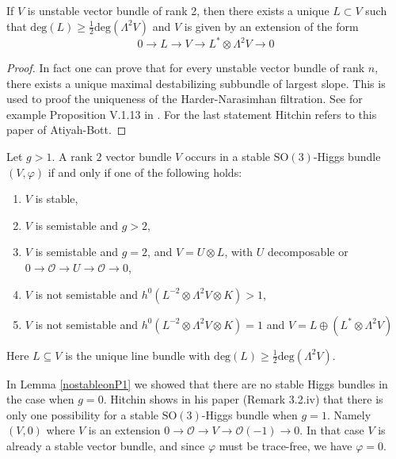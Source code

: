 \begin{lemma}\label{lem:uniqueL}
If $V$ is unstable vector bundle of rank 2, 
then there exists a unique $L \subset V$ such that
$ \mathrm{deg}(L) \geq \frac{1}{2} \mathrm{deg} (\Lambda^2 V ) $ and $V$ is given by an extension of the form
\begin{equation}
    0 \rightarrow  L \rightarrow V \rightarrow  L^* \otimes \Lambda^2V \rightarrow 0 
\end{equation}
\end{lemma}
\begin{proof}
	In fact one can prove that for every unstable vector bundle of rank $n$, there exists a unique maximal destabilizing subbundle of largest slope. This is used to proof the uniqueness of the Harder-Narasimhan filtration. See for example Proposition V.1.13 in \cite{Kob}. For the last statement Hitchin refers to this paper \cite{AB} of Atiyah-Bott.
\end{proof}

\begin{proposition}\label{VinstableHiggs}
    Let $ g>1 $. A rank $2$ vector bundle $V$ occurs in a stable $\mathrm{SO}(3)$-Higgs bundle $(V, \varphi) $ if and only if one of the following holds: 
    \begin{enumerate}[label=(\roman*)]
        \item $V$ is stable,
        \item $V$ is semistable and $g>2$, 
        \item $V$ is semistable and $g=2$, and $V = U \otimes L$, with $U$ decomposable or $0 \rightarrow  \mathcal{O} \rightarrow U \rightarrow \mathcal{O} \rightarrow 0$, 
        \item $V$ is not semistable and $h^0 (L^{-2} \otimes \Lambda^2V \otimes K ) > 1 $,
        \item $V$ is not semistable and $h^0 (L^{-2} \otimes \Lambda^2V \otimes K ) = 1 $ and $V = L\oplus (L^* \otimes \Lambda^2V ) $
    \end{enumerate}
	Here $L\subseteq V$ is the unique line bundle with $\mathrm{deg}(L) \geq \frac{1}{2} \mathrm{deg} (\Lambda^2V ) $.
\end{proposition}

\begin{remark}
	In Lemma \ref{nostableonP1} we showed that there are no stable Higgs bundles in the case when $g=0$. Hitchin shows in his paper (Remark 3.2.iv) that there is only one possibility for a stable $\mathrm{SO}(3)$-Higgs bundle when $g=1$. Namely $(V,0)$ where $V$ is an extension $0\rightarrow \mathcal{O} \rightarrow V \rightarrow \mathcal{O}(-1) \rightarrow 0$. In that case $V$ is already a stable vector bundle, and since $\varphi$ must be trace-free, we have $\varphi=0$. 
\end{remark}

